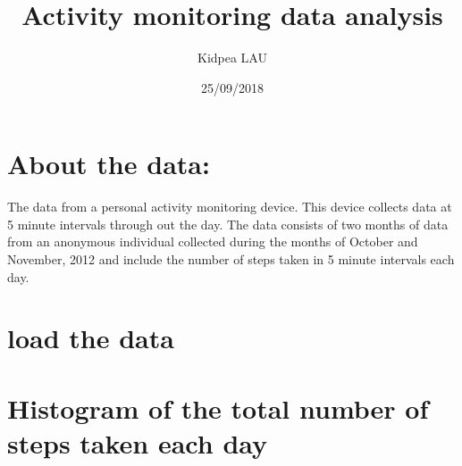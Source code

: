 \documentclass[]{article}
\title{Activity monitoring data analysis}
\author{Kidpea LAU}
\date{25/09/2018}
\newenvironment{Shaded}{\begin{snugshade}}{\end{snugshade}}
\newcommand{\KeywordTok}[1]{\textcolor[rgb]{0.13,0.29,0.53}{\textbf{#1}}}
\newcommand{\DataTypeTok}[1]{\textcolor[rgb]{0.13,0.29,0.53}{#1}}
\newcommand{\StringTok}[1]{\textcolor[rgb]{0.31,0.60,0.02}{#1}}
\newcommand{\OtherTok}[1]{\textcolor[rgb]{0.56,0.35,0.01}{#1}}
\newcommand{\OperatorTok}[1]{\textcolor[rgb]{0.81,0.36,0.00}{\textbf{#1}}}
\newcommand{\NormalTok}[1]{#1}
\begin{document}
\maketitle

\section{About the data:}\label{about-the-data}

The data from a personal activity monitoring device. This device
collects data at 5 minute intervals through out the day. The data
consists of two months of data from an anonymous individual collected
during the months of October and November, 2012 and include the number
of steps taken in 5 minute intervals each day.

\section{load the data}\label{load-the-data}

\begin{Shaded}
\end{Shaded}

\section{Histogram of the total number of steps taken each
day}\label{histogram-of-the-total-number-of-steps-taken-each-day}

\begin{Shaded}
\end{Shaded}
\end{document}

